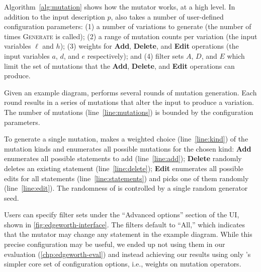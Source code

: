 Algorithm~\ref{alg:mutation} shows how the \Edgeworth mutator works, at a high level. In addition to the input \Substance description $p$, \Edgeworth also takes a number of user-defined configuration parameters: (1) a number of variations to generate (the number of times \textsc{Generate} is called); (2) a range of mutation counts per variation (the input variables $\ell$ and $h$); (3) weights for \textbf{Add}, \textbf{Delete}, and \textbf{Edit} operations (the input variables $a$, $d$, and $e$ respectively); and (4) filter sets $A$, $D$, and $E$ which limit the set of mutations that the \textbf{Add}, \textbf{Delete}, and \textbf{Edit} operations can produce.

Given an example diagram, \Edgeworth performs several rounds of mutation generation. Each round results in a series of mutations that alter the input to produce a variation. The number of mutations (line~\ref{line:mutations}) is bounded by the configuration parameters.

To generate a single mutation, \Edgeworth makes a weighted choice (line~\ref{line:kind}) of the mutation kinds and enumerates all possible mutations for the chosen kind: \textbf{Add} enumerates all possible statements to add (line~\ref{line:add}); \textbf{Delete} randomly deletes an existing statement (line~\ref{line:delete}); \textbf{Edit} enumerates all possible edits for all statements (line~\ref{line:statements}) and picks one of them randomly (line~\ref{line:edit}). The randomness of \Edgeworth is controlled by a single random generator seed.

Users can specify filter sets under the ``Advanced options'' section of the UI, shown in \cref{fig:edgeworth-interface}. The filters default to ``All,'' which indicates that the mutator may change any statement in the example diagram. While this precise configuration may be useful, we ended up not using them in our evaluation (\cref{chp:edgeworth-eval}) and instead achieving our results using only \Edgeworth's simpler core set of configuration options, i.e., weights on mutation operators.



